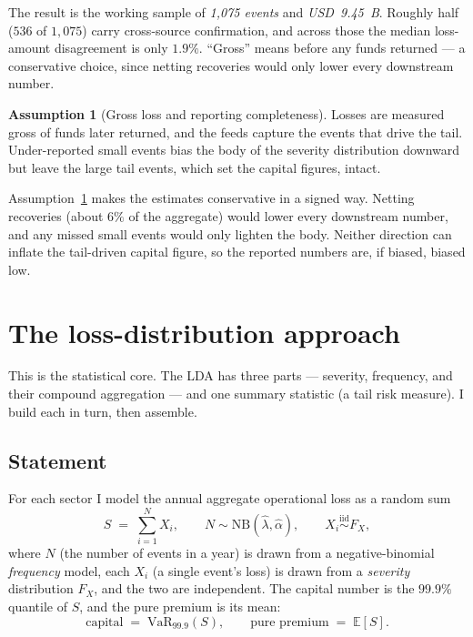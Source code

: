 \documentclass[11pt]{article}
\theoremstyle{definition}
\theoremstyle{remark}
\theoremstyle{definition}
\newtheorem{assumption}{Assumption}
\newcommand{\E}{\mathbb{E}}
\newcommand{\VaR}{\mathrm{VaR}}
\newcommand{\NB}{\mathrm{NB}}
\newcommand{\1}{\mathbf{1}}
\begin{document}
\noindent The result is the working sample of \emph{1{,}075 events} and
\emph{USD~9.45~B}. Roughly
half ($536$ of $1{,}075$) carry cross-source confirmation, and across those
the median loss-amount disagreement is only $1.9\%$. ``Gross'' means before
any funds returned --- a conservative choice, since netting recoveries would
only lower every downstream number.

\begin{assumption}[Gross loss and reporting completeness]\label{as:gross}
Losses are measured gross of funds later returned, and the feeds capture the
events that drive the tail. Under-reported small events bias the body of the
severity distribution downward but leave the large tail events, which set the
capital figures, intact.
\end{assumption}

\noindent Assumption~\ref{as:gross} makes the estimates conservative in a signed
way. Netting recoveries (about $6\%$ of the aggregate) would lower every
downstream number, and any missed small events would only lighten the body.
Neither direction can inflate the tail-driven capital figure, so the reported
numbers are, if biased, biased low.

\section{The loss-distribution approach}\label{sec:lda}

This is the statistical core. The LDA has three parts --- severity, frequency,
and their compound aggregation --- and one summary statistic (a tail risk
measure). I build each in turn, then assemble.

\subsection{Statement}

For each sector I model the annual aggregate operational loss as a random sum
\begin{equation}\label{eq:compound}
S \;=\; \sum_{i=1}^{N} X_i,
\qquad N \sim \NB(\hat\lambda,\hat\alpha),
\qquad X_i \overset{\text{iid}}{\sim} F_X,
\end{equation}
where $N$ (the number of events in a year) is drawn from a negative-binomial
\emph{frequency} model, each $X_i$ (a single event's loss) is drawn from a
\emph{severity} distribution $F_X$, and the two are independent. The capital
number is the $99.9\%$ quantile of $S$, and the pure premium is its mean:
\[
\text{capital} \;=\; \VaR_{99.9}(S), \qquad
\text{pure premium} \;=\; \E[S].
\]
\end{document}

